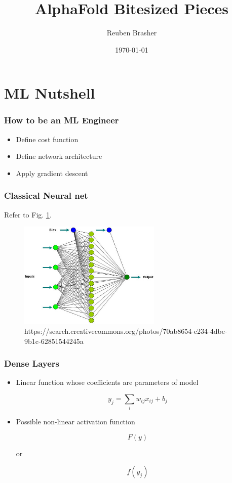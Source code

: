 \documentclass{beamer}
\title{AlphaFold Bitesized Pieces}
\author{Reuben Brasher}
\date{\today}
\begin{document}
\frame{\titlepage}

\section[Outline]{}
\frame{\tableofcontents}

\section{ML Nutshell}
\frame
{
   \frametitle{How to be an ML Engineer}

   \begin{itemize}
      \item<1-> Define cost function

      \item<2-> Define network architecture
      
      \item<3-> Apply gradient descent
      
   \end{itemize}
}

\frame
{
   \frametitle{Classical Neural net}
   
   Refer to Fig. \ref{fig:neuralnet}.
   
   \begin{figure}[ht]
      \includegraphics[height=2in,keepaspectratio]{images/7880863848_0698ba4909.jpg}
      \caption{https://search.creativecommons.org/photos/70ab8654-c234-4dbe-9b1c-62851544245a} \label{fig:neuralnet}
   \end{figure}
}

\frame
{
   \frametitle{Dense Layers}

   \begin{itemize}
      \item<1-> Linear function whose coefficients are parameters of model

         $$y_j = \sum_i w_{ij} x_{ij} + b_j$$

      \item<2-> Possible non-linear activation function

         $$F(y)$$

         or

         $$f(y_j)$$

   \end{itemize}
}
\end{document}
